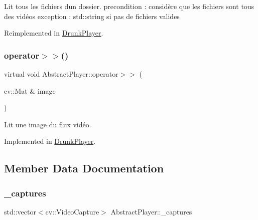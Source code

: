 Lit tous les fichiers d\textquotesingle{}un dossier. precondition \+: considère que les fichiers sont tous des vidéos exception \+: std\+::string si pas de fichiers valides 

Reimplemented in \hyperlink{classDrunkPlayer_a235e60ea8a97c4d26277b066c2cebe80}{Drunk\+Player}.

\mbox{\label{classAbstractPlayer_a5c9a863c96224dd297aa44c69010cd94}} 
\subsubsection{\texorpdfstring{operator$>$$>$()}{operator>>()}}
{\footnotesize\ttfamily virtual void Abstract\+Player\+::operator$>$$>$ (\begin{DoxyParamCaption}\item[{cv\+::\+Mat \&}]{image }\end{DoxyParamCaption})\hspace{0.3cm}{\ttfamily [pure virtual]}}



Lit une image du flux vidéo. 



Implemented in \hyperlink{classDrunkPlayer_a2662f5010e15c95ca6639f56f012aed1}{Drunk\+Player}.



\subsection{Member Data Documentation}
\mbox{\label{classAbstractPlayer_a72dd2ef25310decd45671a7d51e1f319}} 
\subsubsection{\texorpdfstring{\+\_\+captures}{\_captures}}
{\footnotesize\ttfamily std\+::vector$<$cv\+::\+Video\+Capture$>$ Abstract\+Player\+::\+\_\+captures\hspace{0.3cm}{\ttfamily [protected]}}

\mbox{\label{classAbstractPlayer_a9d8395a141cc985622d4910209bc7d53}} 

